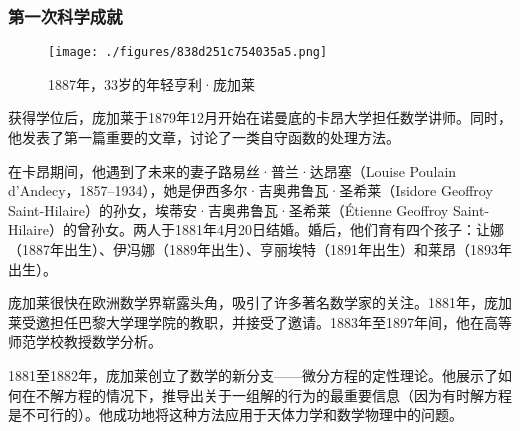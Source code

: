 \subsubsection{第一次科学成就}
\begin{figure}[ht]
\centering
\texttt{[image: ./figures/838d251c754035a5.png]}
\caption{1887年，33岁的年轻亨利·庞加莱} \label{fig_HLPJL_2}
\end{figure}
获得学位后，庞加莱于1879年12月开始在诺曼底的卡昂大学担任数学讲师。同时，他发表了第一篇重要的文章，讨论了一类自守函数的处理方法。

在卡昂期间，他遇到了未来的妻子路易丝·普兰·达昂塞（Louise Poulain d'Andecy，1857–1934），她是伊西多尔·吉奥弗鲁瓦·圣希莱（Isidore Geoffroy Saint-Hilaire）的孙女，埃蒂安·吉奥弗鲁瓦·圣希莱（Étienne Geoffroy Saint-Hilaire）的曾孙女。两人于1881年4月20日结婚。婚后，他们育有四个孩子：让娜（1887年出生）、伊冯娜（1889年出生）、亨丽埃特（1891年出生）和莱昂（1893年出生）。

庞加莱很快在欧洲数学界崭露头角，吸引了许多著名数学家的关注。1881年，庞加莱受邀担任巴黎大学理学院的教职，并接受了邀请。1883年至1897年间，他在高等师范学校教授数学分析。

1881至1882年，庞加莱创立了数学的新分支——微分方程的定性理论。他展示了如何在不解方程的情况下，推导出关于一组解的行为的最重要信息（因为有时解方程是不可行的）。他成功地将这种方法应用于天体力学和数学物理中的问题。

